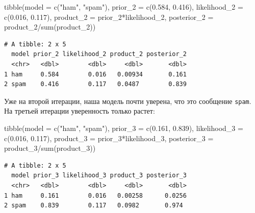 \documentclass[
]{book}
\newenvironment{Shaded}{\begin{snugshade}}{\end{snugshade}}
\newcommand{\AttributeTok}[1]{\textcolor[rgb]{0.77,0.63,0.00}{#1}}
\newcommand{\FloatTok}[1]{\textcolor[rgb]{0.00,0.00,0.81}{#1}}
\newcommand{\FunctionTok}[1]{\textcolor[rgb]{0.00,0.00,0.00}{#1}}
\newcommand{\NormalTok}[1]{#1}
\newcommand{\SpecialCharTok}[1]{\textcolor[rgb]{0.00,0.00,0.00}{#1}}
\newcommand{\StringTok}[1]{\textcolor[rgb]{0.31,0.60,0.02}{#1}}
\begin{document}
\begin{Shaded}
\begin{Highlighting}[]
\FunctionTok{tibble}\NormalTok{(}\AttributeTok{model =} \FunctionTok{c}\NormalTok{(}\StringTok{"ham"}\NormalTok{, }\StringTok{"spam"}\NormalTok{),}
       \AttributeTok{prior\_2 =} \FunctionTok{c}\NormalTok{(}\FloatTok{0.584}\NormalTok{, }\FloatTok{0.416}\NormalTok{),}
       \AttributeTok{likelihood\_2 =} \FunctionTok{c}\NormalTok{(}\FloatTok{0.016}\NormalTok{, }\FloatTok{0.117}\NormalTok{),}
       \AttributeTok{product\_2 =}\NormalTok{ prior\_2}\SpecialCharTok{*}\NormalTok{likelihood\_2,}
       \AttributeTok{posterior\_2 =}\NormalTok{ product\_2}\SpecialCharTok{/}\FunctionTok{sum}\NormalTok{(product\_2))}
\end{Highlighting}
\end{Shaded}

\begin{verbatim}
# A tibble: 2 x 5
  model prior_2 likelihood_2 product_2 posterior_2
  <chr>   <dbl>        <dbl>     <dbl>       <dbl>
1 ham     0.584        0.016   0.00934       0.161
2 spam    0.416        0.117   0.0487        0.839
\end{verbatim}

Уже на второй итерации, наша модель почти уверена, что это сообщение \texttt{spam}. На третьей итерации уверенность только растет:

\begin{Shaded}
\begin{Highlighting}[]
\FunctionTok{tibble}\NormalTok{(}\AttributeTok{model =} \FunctionTok{c}\NormalTok{(}\StringTok{"ham"}\NormalTok{, }\StringTok{"spam"}\NormalTok{),}
       \AttributeTok{prior\_3 =} \FunctionTok{c}\NormalTok{(}\FloatTok{0.161}\NormalTok{, }\FloatTok{0.839}\NormalTok{),}
       \AttributeTok{likelihood\_3 =} \FunctionTok{c}\NormalTok{(}\FloatTok{0.016}\NormalTok{, }\FloatTok{0.117}\NormalTok{),}
       \AttributeTok{product\_3 =}\NormalTok{ prior\_3}\SpecialCharTok{*}\NormalTok{likelihood\_3,}
       \AttributeTok{posterior\_3 =}\NormalTok{ product\_3}\SpecialCharTok{/}\FunctionTok{sum}\NormalTok{(product\_3))}
\end{Highlighting}
\end{Shaded}

\begin{verbatim}
# A tibble: 2 x 5
  model prior_3 likelihood_3 product_3 posterior_3
  <chr>   <dbl>        <dbl>     <dbl>       <dbl>
1 ham     0.161        0.016   0.00258      0.0256
2 spam    0.839        0.117   0.0982       0.974 
\end{verbatim}
\end{document}
